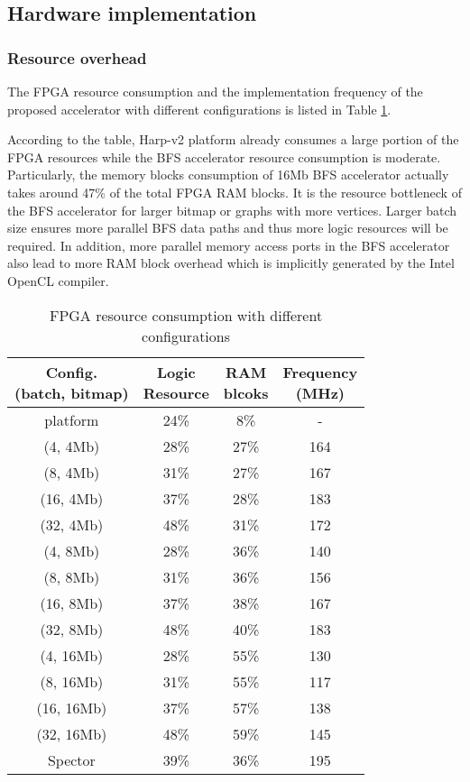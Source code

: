 \subsection{Hardware implementation}
\subsubsection{Resource overhead}
The FPGA resource consumption and the implementation frequency of 
the proposed accelerator with different configurations 
is listed in Table \ref{tab:resource}. 

According to the table, Harp-v2 platform already consumes 
a large portion of the FPGA resources while the BFS accelerator resource 
consumption is moderate. Particularly, the memory blocks consumption of 
16Mb BFS accelerator actually takes around 47\% of the total FPGA 
RAM blocks. It is the resource bottleneck of the BFS 
accelerator for larger bitmap or graphs with more vertices.
Larger batch size ensures more parallel BFS data paths and 
thus more logic resources will be required. In addition, more 
parallel memory access ports in the BFS accelerator also lead to 
more RAM block overhead which is implicitly generated by the Intel 
OpenCL compiler.

\begin{table}
  \caption{FPGA resource consumption with different configurations}
  \label{tab:resource}
    \centering
  \begin{tabular}{cccc}
    \toprule
	\shortstack{Config. \\ (batch, bitmap)} & \shortstack{Logic \\ Resource} & \shortstack{RAM \\ blcoks} & \shortstack{Frequency \\ (MHz)} \\
    \midrule
	  platform   & 24\% & 8\%  & -   \\
	  (4, 4Mb)   & 28\% & 27\% & 164 \\
	  (8, 4Mb)   & 31\% & 27\% & 167 \\
	  (16, 4Mb)  & 37\% & 28\% & 183 \\
	  (32, 4Mb)  & 48\% & 31\% & 172 \\
	  (4, 8Mb)  & 28\% & 36\% & 140 \\
	  (8, 8Mb)  & 31\% & 36\% & 156 \\
	  (16, 8Mb) & 37\% & 38\% & 167 \\
	  (32, 8Mb) & 48\% & 40\% & 183 \\
	  (4, 16Mb)  & 28\% & 55\% & 130 \\
	  (8, 16Mb)  & 31\% & 55\% & 117 \\
	  (16, 16Mb) & 37\% & 57\% & 138 \\
	  (32, 16Mb) & 48\% & 59\% & 145 \\
	  \midrule
      Spector    & 39\% & 36\% & 195 \\
  \bottomrule
\end{tabular}
\vspace{-1em}
\end{table}

